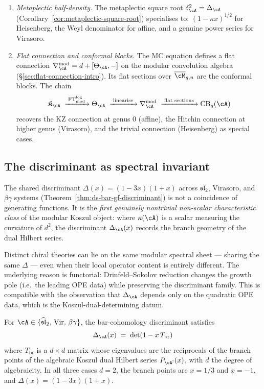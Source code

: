 \begin{enumerate}[label=\textup{(\alph*)}]
\item \emph{Metaplectic half-density.}
  The metaplectic square root
  $\delta_\cA^2 = \Delta_\cA$
  (Corollary~\ref{cor:metaplectic-square-root}) specialises to:
  $(1 - \kappa x)^{1/2}$ for Heisenberg,
  the Weyl denominator for affine, and a genuine power series for
  Virasoro.

\item \emph{Flat connection and conformal blocks.}
  The MC equation defines a flat connection
  $\nabla^{\mathrm{mod}}_\cA = d + [\Theta_\cA, -]$ on the
  modular convolution algebra
  (\S\ref{sec:flat-connection-intro}).  Its flat sections over
  $\overline{\cM}_{g,n}$ are the conformal blocks.  The chain
  \[
  \mathfrak K_\cA
  \;\xrightarrow{\;\operatorname{FT}^{\log}_{\mathrm{mod}}\;}
  \Theta_\cA
  \;\xrightarrow{\;\text{linearise}\;}
  \nabla^{\mathrm{mod}}_\cA
  \;\xrightarrow{\;\text{flat sections}\;}
  \operatorname{CB}_g(\cA)
  \]
  recovers the KZ connection at genus $0$ (affine), the Hitchin
  connection at higher genus (Virasoro), and the trivial connection
  (Heisenberg) as special cases.
\end{enumerate}

\subsection{The discriminant as spectral invariant}

The shared discriminant $\Delta(x) = (1 - 3x)(1+x)$ across
$\mathfrak{sl}_2$, Virasoro, and $\beta\gamma$ systems
(Theorem~\ref{thm:ds-bar-gf-discriminant}) is not a coincidence
of generating functions.  It is the \emph{first genuinely
nontrivial non-scalar characteristic class} of the modular Koszul
object: where $\kappa(\cA)$ is a scalar measuring the curvature
of $d^2$, the discriminant $\Delta_{\cA}(x)$ records the branch
geometry of the dual Hilbert series.

Distinct chiral theories can lie on the same modular spectral
sheet --- sharing the same $\Delta$ --- even when their local
operator content is entirely different.  The underlying reason
is functorial: Drinfeld--Sokolov reduction changes the growth pole
(i.e.\ the leading OPE data) while preserving the discriminant
family.  This is compatible with the observation that
$\Delta_{\cA}$ depends only on the quadratic OPE data, which is
the Koszul-dual-determining datum.

\begin{theorem}
\label{thm:discriminant-spectral-verified}
For $\cA \in \{\widehat{\mathfrak{sl}}_2,\, \mathrm{Vir},\,
\beta\gamma\}$, the bar-cohomology discriminant satisfies
\[
\Delta_{\cA}(x) \;=\; \det(1 - x\, T_{\mathrm{br}})
\]
where $T_{\mathrm{br}}$ is a $d \times d$ matrix whose eigenvalues
are the reciprocals of the branch points of the algebraic Koszul
dual Hilbert series $P_{\cA^!}(x)$, with $d$ the degree of
algebraicity.
In all three cases $d = 2$, the branch points are $x = 1/3$
and $x = -1$, and
$\Delta(x) = (1 - 3x)(1 + x)$.
\end{theorem}

